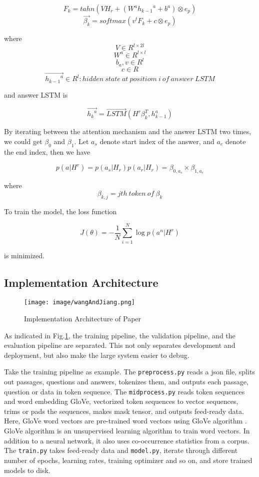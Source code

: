 \documentclass[12pt]{article}
\begin{document}
$$F_k = tahn(VH_r + (W^a{h_{k-1}}^a +  b^a) \otimes e_p)$$
$$\overrightarrow{\beta _k} = softmax(v^tF_k + c \otimes e_p)$$


where
$$V \in R^{l \times 2l}$$
$$W^a\in R^{l \times l} $$
$$b_a, v\in R^{l}  $$
$$c \in R $$
$$\overrightarrow{{h_{k-1}}^a}\in R^{l}: hidden\ state\ at\ positiom\ i\ of\ answer\ LSTM  $$

and answer LSTM is


$$\overrightarrow{{h_k}^a} = \overrightarrow{LSTM}(H^r\beta _k^T, h_{k-1}^a)$$

By iterating between the attention mechanism and the answer LSTM two times, we could get $\beta _0$ and $\beta _1$. Let $a_s$ denote start index of the answer, and $a_e$ denote the end index, then we have

$$p(a|H^r) = p(a_s|H_r)p(a_r|H_r)=\beta _{0, a_s} \times \beta_{1, a_e}$$

where $$\beta_{k, j} = jth\ token\ of\ \beta _k$$

To train the model, the loss function

$$J(\theta) = -\frac{1}{N}\sum_{i=1}^{N} \log{p(a^n|H^r)} $$

is minimized.


\subsection{Implementation Architecture}\label{sec:architectures}


\begin{figure}[h]
\texttt{[image: image/wangAndJiang.png]}
\centering
\caption{Implementation Architecture of Paper \cite{wang2016machine}}
\label{fig:wangAndJiang}
\end{figure}

As indicated in Fig.\ref{fig:wangAndJiang}, the training pipeline, the validation pipeline, and the evaluation pipeline are separated. This not only separates development and deployment, but also make the large system easier to debug.

Take the training pipeline as example. The \texttt{preprocess.py} reads a json file, splits out passages, questions and answers, tokenizes them, and outputs each passage, question or data in token sequence. The \texttt{midprocess.py} reads token sequences and word embedding GloVe, vectorized token sequences to vector sequences, trims or pads the sequences, makes mask tensor, and outputs feed-ready data. Here, GloVe word vectors are pre-trained word vectors using GloVe algorithm \cite{pennington2014glove}. GloVe algorithm is an unsupervised learning algorithm to train word vectors. In addition to a neural network, it also uses co-occurrence statistics from a corpus. The \texttt{train.py} takes feed-ready data and \texttt{model.py}, iterate through different number of epochs, learning rates, training optimizer and so on, and store trained models to disk.
\end{document}
